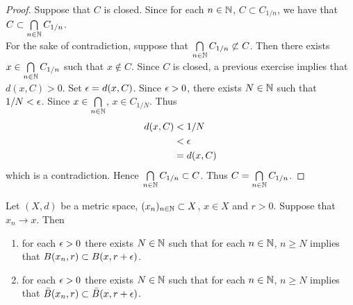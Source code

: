 \documentclass{book}
\begin{document}
\begin{proof}
	Suppose that $C$ is closed. Since for each $n \in \mathbb{N}$, $C \subset C_{1/n}$, we have that $C \subset \bigcap\limits_{n \in \mathbb{N}} C_{1/n}$. \\
	For the sake of contradiction, suppose that $\bigcap\limits_{n \in \mathbb{N}} C_{1/n} \not \subset C$. Then there exists $x \in \bigcap\limits_{n \in \mathbb{N}} C_{1/n}$ such that $x \not \in C$. Since $C$ is closed, a previous exercise implies that $d(x, C) > 0$. Set $\epsilon = d(x, C)$. Since $\epsilon >0$, there exists $N \in \mathbb{N}$ such that $1/N < \epsilon$. Since $x \in \bigcap\limits_{n \in \mathbb{N}}$, $x \in C_{1/N}$. Thus 
	\begin{align*}
		d(x, C)
		& < 1/N \\
		& < \epsilon \\
		& = d(x, C)
	\end{align*}
	which is a contradiction. Hence $\bigcap\limits_{n \in \mathbb{N}} C_{1/n} \subset C$. Thus $C = \bigcap\limits_{n \in \mathbb{N}} C_{1/n}$.
\end{proof}

\begin{ex}
	Let $(X, d)$ be a metric space, $(x_n)_{n \in \mathbb{N}} \subset X$, $x \in X$ and $r > 0$. Suppose that $x_n \rightarrow x$. Then 
	\begin{enumerate}
		\item for each $\epsilon > 0$ there exists $N \in \mathbb{N}$ such that for each $n \in \mathbb{N}$, $n \geq N$ implies that $B(x_n, r) \subset B(x, r+\epsilon)$.
		\item for each $\epsilon > 0$ there exists $N \in \mathbb{N}$ such that for each $n \in \mathbb{N}$, $n \geq N$ implies that $\bar{B}(x_n, r) \subset \bar{B}(x, r+\epsilon)$.
	\end{enumerate} 
\end{ex}
\end{document}
